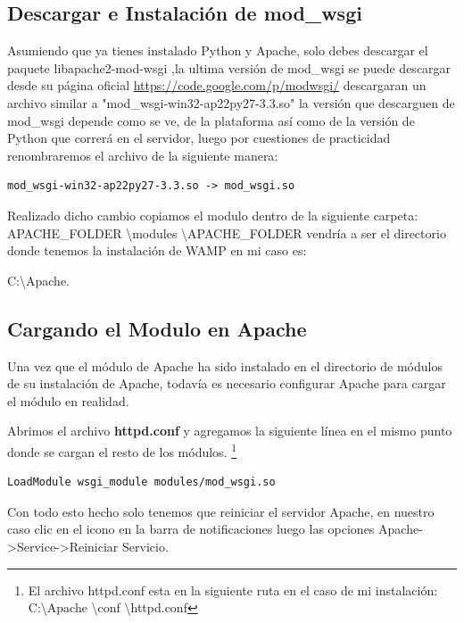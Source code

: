 \subsection{Descargar e Instalación de mod\_wsgi}

 Asumiendo que ya  tienes instalado Python y Apache, solo debes descargar el paquete  libapache2-mod-wsgi ,la ultima versión de mod\_wsgi se puede descargar desde su  página oficial  \url{https://code.google.com/p/modwsgi/} descargaran un archivo  similar a "mod\_wsgi-win32-ap22py27-3.3.so" la versión que descarguen de mod\_wsgi  depende como se ve, de la plataforma así como de la versión de Python que  correrá en el servidor, luego por cuestiones de practicidad renombraremos  el archivo de la siguiente manera:

\begin{lstlisting}[style=consola]
    mod_wsgi-win32-ap22py27-3.3.so -> mod_wsgi.so
\end{lstlisting}
\vspace{0.1cm}

Realizado dicho cambio copiamos el modulo dentro de la siguiente carpeta: APACHE\_FOLDER \textbackslash modules \textbackslash APACHE\_FOLDER vendría a ser el directorio donde tenemos la instalación de WAMP en mi caso es: 

C:\textbackslash Apache.

\subsection{Cargando el Modulo en Apache}

Una vez que el módulo de Apache ha sido instalado en el directorio de módulos de su instalación de Apache, todavía es necesario configurar Apache para cargar el módulo en realidad.

Abrimos el archivo \textbf{httpd.conf} y agregamos la siguiente línea en el mismo punto donde se cargan el resto de los módulos. \footnote {El archivo httpd.conf esta en la siguiente ruta en el caso de mi instalación: C:\textbackslash Apache \textbackslash conf \textbackslash httpd.conf}

\begin{lstlisting}[style=consola]
    LoadModule wsgi_module modules/mod_wsgi.so
\end{lstlisting}
\vspace{0.1cm}

Con todo esto hecho solo tenemos que reiniciar el servidor Apache, en nuestro  caso clic en el icono en la barra de notificaciones luego las opciones  Apache->Service->Reiniciar Servicio. 

